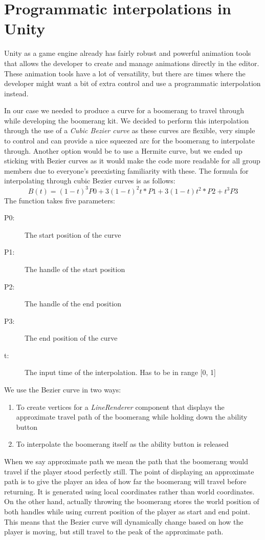 \section{Programmatic interpolations in Unity}
\label{sec:boomerangCurve}
Unity as a game engine already has fairly robust and powerful animation tools that allows the developer to create and manage animations directly in the editor. These animation tools have a lot of versatility, but there are times where the developer might want a bit of extra control and use a programmatic interpolation instead. 

In our case we needed to produce a curve for a boomerang to travel through while developing the boomerang kit. We decided to perform this interpolation through the use of a \emph{Cubic Bezier curve} as these curves are flexible, very simple to control and can provide a nice squeezed arc for the boomerang to interpolate through. Another option would be to use a Hermite curve, but we ended up sticking with Bezier curves as it would make the code more readable for all group members due to everyone's preexisting familiarity with these. The formula for interpolating through cubic Bezier curves is as follows:
$$
B(t) = (1 - t)^3 P0 + 3(1 - t)^2 t * P1 + 3(1 - t)t^2 * P2 + t^3 P3 
$$
The function takes five parameters:
\begin{description}
    \item[P0:] The start position of the curve
    \item[P1:] The handle of the start position
    \item[P2:] The handle of the end position
    \item[P3:] The end position of the curve
    \item[t:]  The input time of the interpolation. Has to be in range [0, 1]
\end{description}

We use the Bezier curve in two ways:
\begin{enumerate}
    \item To create vertices for a \emph{LineRenderer} component that displays the approximate travel path of the boomerang while holding down the ability button
    \item To interpolate the boomerang itself as the ability button is released
\end{enumerate}
When we say approximate path we mean the path that the boomerang would travel if the player stood perfectly still.
The point of displaying an approximate path is to give the player an idea of how far the boomerang will travel before returning. It is generated using local coordinates rather than world coordinates. On the other hand, actually throwing the boomerang stores the world position of both handles while using current position of the player as start and end point. This means that the Bezier curve will dynamically change based on how the player is moving, but still travel to the peak of the approximate path.  


